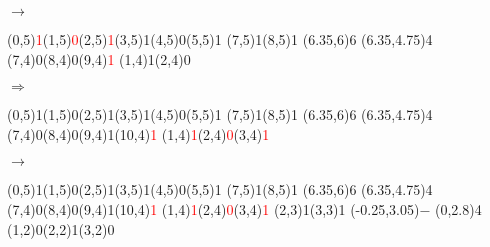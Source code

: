 \documentclass[11pt,a4paper]{article}
\begin{document}
\begin{center}
\begin{table}[ht!]
\begin{minipage}{0.15\textwidth}
  \end{minipage}
  \hfillx
  \begin{minipage}{0.1\textwidth}
    \centering

$ \rightarrow $

  \end{minipage}
\end{table}


\begin{table}[ht!]
  \centering
  \begin{minipage}{0.15\textwidth}

\par\vspace{6\oplineheight}
\oplput(0,5){\textcolor{red}{1}}\oplput(1,5){\textcolor{red}{0}}\oplput(2,5){\textcolor{red}{1}}\oplput(3,5){1}\oplput(4,5){0}\oplput(5,5){1}
\oplput(7,5){1}\oplput(8,5){1}
\opvline(6.35,6){6}
\ophline(6.35,4.75){4}
\oplput(7,4){0}\oplput(8,4){0}\oplput(9,4){\textcolor{red}{1}}
\oplput(1,4){1}\oplput(2,4){0}

  \end{minipage}
  \hfillx
  \begin{minipage}{0.1\textwidth}
    \centering

$ \Rightarrow $

  \end{minipage}
  \hfillx
  \begin{minipage}{0.15\textwidth}

\par\vspace{6\oplineheight}
\oplput(0,5){1}\oplput(1,5){0}\oplput(2,5){1}\oplput(3,5){1}\oplput(4,5){0}\oplput(5,5){1}
\oplput(7,5){1}\oplput(8,5){1}
\opvline(6.35,6){6}
\ophline(6.35,4.75){4}
\oplput(7,4){0}\oplput(8,4){0}\oplput(9,4){1}\oplput(10,4){\textcolor{red}{1}}
\oplput(1,4){\textcolor{red}{1}}\oplput(2,4){\textcolor{red}{0}}\oplput(3,4){\textcolor{red}{1}}

  \end{minipage}
  \hfillx
  \begin{minipage}{0.1\textwidth}
    \centering

$ \rightarrow $

  \end{minipage}
  \hfillx
  \begin{minipage}{0.15\textwidth}

\par\vspace{6\oplineheight}
\oplput(0,5){1}\oplput(1,5){0}\oplput(2,5){1}\oplput(3,5){1}\oplput(4,5){0}\oplput(5,5){1}
\oplput(7,5){1}\oplput(8,5){1}
\opvline(6.35,6){6}
\ophline(6.35,4.75){4}
\oplput(7,4){0}\oplput(8,4){0}\oplput(9,4){1}\oplput(10,4){\textcolor{red}{1}}
\oplput(1,4){\textcolor{red}{1}}\oplput(2,4){\textcolor{red}{0}}\oplput(3,4){\textcolor{red}{1}}
\oplput(2,3){1}\oplput(3,3){1}
\oplput(-0.25,3.05){$-$}
\ophline(0,2.8){4}
\oplput(1,2){0}\oplput(2,2){1}\oplput(3,2){0}


\end{minipage}
\end{table}
\end{center}
\end{document}
